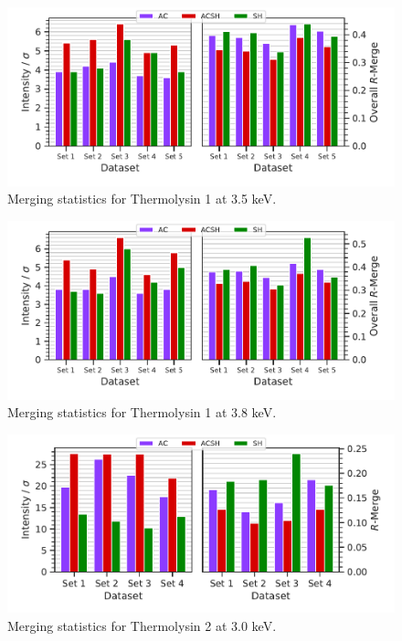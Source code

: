 \begin{figure}
    \centering
    \includegraphics{plots/exp1/tlys_9_P6122/3p5_stats_grid.pdf}
    \caption{Merging statistics for Thermolysin 1 at 3.5 \unit{keV}.}
    \label{fig:tlys_9_3p5}
\end{figure}

\begin{figure}
    \centering
    \includegraphics{plots/exp1/tlys_9_P6122/3p8_stats_grid.pdf}
    \caption{Merging statistics for Thermolysin 1 at 3.8 \unit{keV}.}
    \label{fig:tlys_9_3p8}
\end{figure}


\begin{figure}
    \centering
    \includegraphics{plots/exp1/tlys_2_P6122/3p0_stats_grid.pdf}
    \caption{Merging statistics for Thermolysin 2 at 3.0 \unit{keV}.}
    \label{fig:tlys_2_3p0}
\end{figure}


